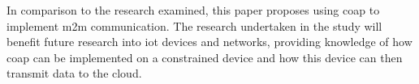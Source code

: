 In comparison to the research examined, this paper proposes using \gls{coap} to 
implement \gls{m2m} communication. 
The research undertaken in the study will benefit future research into \gls{iot}
devices and networks, providing knowledge of how \gls{coap} can be 
implemented on a constrained device and how this device can then transmit
data to the cloud.